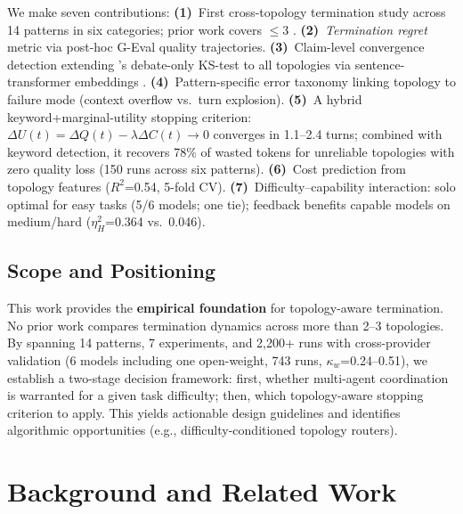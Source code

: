 \documentclass{article}
\begin{document}
We make seven contributions:
\textbf{(1)}~First cross-topology termination study across 14 patterns in six categories; prior work covers $\leq$3 \citep{cemri2025why,hu2025when}.
\textbf{(2)}~\emph{Termination regret} metric via post-hoc G-Eval \citep{liu2023geval} quality trajectories.
\textbf{(3)}~Claim-level convergence detection extending \citet{hu2025when}'s debate-only KS-test to all topologies via sentence-transformer embeddings \citep{reimers2019sentence}.
\textbf{(4)}~Pattern-specific error taxonomy linking topology to failure mode (context overflow vs.\ turn explosion).
\textbf{(5)}~A hybrid keyword+marginal-utility stopping criterion: $\Delta U(t) = \Delta Q(t) - \lambda \Delta C(t) \to 0$ converges in 1.1--2.4 turns; combined with keyword detection, it recovers 78\% of wasted tokens for unreliable topologies with zero quality loss (150 runs across six patterns).
\textbf{(6)}~Cost prediction from topology features ($R^2$=0.54, 5-fold CV).
\textbf{(7)}~Difficulty--capability interaction: solo optimal for easy tasks (5/6 models; one tie); feedback benefits capable models on medium/hard ($\eta^2_H$=0.364 vs.\ 0.046).

\subsection{Scope and Positioning}
\vspace{-1mm}

This work provides the \textbf{empirical foundation} for topology-aware termination. No prior work compares termination dynamics across more than 2--3 topologies. By spanning 14 patterns, 7 experiments, and 2,200+ runs with cross-provider validation (6 models including one open-weight, 743 runs, $\kappa_w$=0.24--0.51), we establish a two-stage decision framework: first, whether multi-agent coordination is warranted for a given task difficulty; then, which topology-aware stopping criterion to apply. This yields actionable design guidelines and identifies algorithmic opportunities (e.g., difficulty-conditioned topology routers).

\vspace{-1mm}
\section{Background and Related Work}
\label{sec:background}
\vspace{-1mm}
\end{document}
